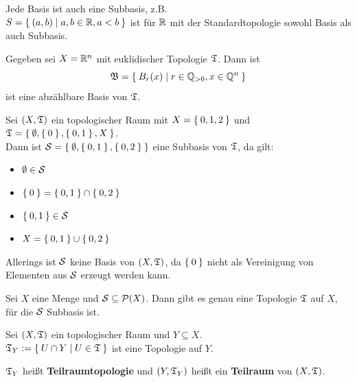 \begin{beispiel}
    \begin{bspenum}
        \item Jede Basis ist auch eine Subbasis, z.B.\\
              $S=\Set{ (a,b) | a,b \in \ensuremath{\mathbb{R}}, a<b }$ ist für $\mathbb{R}$ mit der 
              Standardtopologie sowohl Basis als auch Subbasis.
        \item Gegeben sei $X = \mathbb{R}^n$ mit euklidischer Topologie $\mathfrak{T}$. Dann ist
              \[\mathfrak{B} = \Set{B_r(x) | r \in \ensuremath{\mathbb{Q}}_{> 0}, x \in \ensuremath{\mathbb{Q}}^n}\]
              ist eine abzählbare Basis von $\mathfrak{T}$.
        \item Sei $(X, \mathfrak{T})$ ein topologischer Raum mit 
              $X = \Set{0,1,2}$ und $\mathfrak{T} = \Set{\emptyset, \Set{0}, \Set{0,1}, X}$.\\
              Dann ist $\mathcal{S} = \Set{\emptyset, \Set{0,1}, \Set{0,2}}$ eine Subbasis von 
              $\mathfrak{T}$, da gilt:
              \begin{itemize}
                \item $\emptyset \in \mathcal{S}$
                \item $\Set{0} = \Set{0, 1} \cap \Set{0,2}$
                \item $\Set{0,1} \in \mathcal{S}$
                \item $X = \Set{0,1} \cup \Set{0,2}$
              \end{itemize}
              Allerings ist $\mathcal{S}$ keine Basis von $(X, \mathfrak{T})$, da
              $\Set{0}$ nicht als Vereinigung von Elementen aus $\mathcal{S}$
              erzeugt werden kann.
    \end{bspenum}
\end{beispiel}

\begin{bemerkung}
    Sei $X$ eine Menge und $\mathcal{S} \subseteq \mathcal{P}(X)$. Dann gibt es
    genau eine Topologie $\mathfrak{T}$ auf $X$, für die $\mathcal{S}$ Subbasis ist.
\end{bemerkung}

\begin{definition}%
    Sei $(X, \mathfrak{T})$ ein topologischer Raum und $Y \subseteq X$.\\
    $\mathfrak{T}_Y := \Set{U \cap Y | U \in \mathfrak{T}}$ ist eine Topologie auf $Y$.

    $\mathfrak{T}_Y$ heißt \textbf{Teilraumtopologie} und $(Y, \mathfrak{T}_Y)$ heißt ein 
    \textbf{Teilraum} von $(X, \mathfrak{T})$.
\end{definition}

